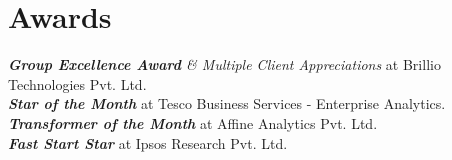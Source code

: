 \section{Awards}
  \begin{itemize}[leftmargin=0.1in, label={}]
    \normalsize{
      \item{
        \textit{\textbf{Group Excellence Award} \& Multiple Client Appreciations} at Brillio Technologies Pvt. Ltd. \\
        \textit{\textbf{Star of the Month}} at Tesco Business Services - Enterprise Analytics. \\
        \textit{\textbf{Transformer of the Month}} at Affine Analytics Pvt. Ltd. \\
        \textit{\textbf{Fast Start Star}} at Ipsos Research Pvt. Ltd.
      }
    }
  \end{itemize}
